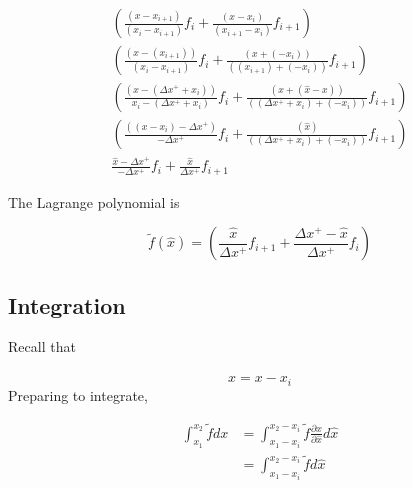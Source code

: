\documentclass[12pt]{article}
\begin{document}
\begin{align*}
    \left( \frac{
            \left( x - x_{i+1} \right)
            }{
            \left( x_i - x_{i+1} \right)
        }
        f_i
        + \frac{
            \left( x - x_i  \right)
            }{
            \left(x_{i+1}- x_i \right)
        }
        f_{i+1}
    \right) \\
    \left( 
        \frac{
            \left( x - \left( x_{i+1} \right) \right)
            }{
            \left( x_i - x_{i+1}\right)
        } 
        f_i + 
        \frac{
            \left( x + \left( -x_i \right) \right)
            }{
            \left( \left( x_{i+1} \right) + \left( -x_i \right) \right)
        }
        f_{i+1}
    \right) \\
    \left(
        \frac{
            (x-\left( \Delta x^+ + x_i \right)) 
            }{
            x_i - (\Delta x^+ + x_i)
        }
        f_i
        +
        \frac{ 
            \left( x + \left( \hat{x} - x \right) \right)
            }{
            \left( \left( \Delta x^+ + x_i \right) + \left( -x_i \right) \right)
        }
        f_{i+1}
    \right)  \\
    \left(
        \frac{
            (\left(x-x_i  \right) -\Delta x^+)   
            }{ 
            - \Delta x^+ 
        }
        f_i
        +
        \frac{
            \left(   \hat{x}    \right)
            }{\left( \left(  \Delta x^+ + x_i \right)  + \left( -x_i \right) \right)
        } f_{i+1}
    \right) \\
    \frac{
        \hat{x} - \Delta x^+
        }{
        -\Delta x^+
    }
    f_i
    +
    \frac{
        \hat{x}
        }{
        \Delta x^+
    }
    f_{i+1}
\end{align*}

The Lagrange polynomial is

\begin{equation*}
    \widetilde{f}\left( \hat{x} \right) 
    =
    \left( 
        \frac{\hat{x}}{\Delta x^+}f_{i+1} +
        \frac{\Delta x^+ - \hat{x}}{\Delta x^+}f_i
    \right)
\end{equation*}

\subsection{Integration}

Recall that 

\[ \hat{x} = x - x_i\]
Preparing to integrate,

\begin{align*}
    \int_{x_1}^{x_2} \widetilde{f} dx &=
    \int_{x_1-x_i}^{x_2-x_i} \widetilde{f} \frac{\partial x}{\partial \hat{x}}d\hat{x}\\
                                      &=
                                      \int_{x_1-x_i}^{x_2 - x_i} \widetilde{f} d\hat{x}
\end{align*}
\end{document}
